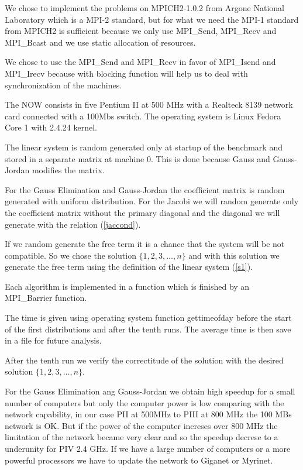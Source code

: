 \documentclass[times,10pt,twocolumn]{article}
\begin{document}

We chose to implement the problems on MPICH2-1.0.2 from Argone
National Laboratory \cite{argone} which is a MPI-2 standard, but
for what we need the MPI-1 standard from MPICH2 is sufficient
because we only use MPI\_Send, MPI\_Recv and MPI\_Bcast and we use
static allocation of resources.

We chose to use the MPI\_Send and MPI\_Recv in favor of MPI\_Isend
and MPI\_Irecv because with blocking function will help us to deal
with synchronization of the machines.

The NOW consists in five Pentium II at 500 MHz with a Realteck
8139 network card connected with a 100Mbs switch. The operating
system is Linux Fedora Core 1 with 2.4.24 kernel.

The linear system is random generated only at startup of the
benchmark and stored in a separate matrix at machine 0. This is
done because Gauss and Gauss-Jordan modifies the matrix.

For the Gauss Elimination and Gauss-Jordan the coefficient matrix
is random generated with uniform distribution. For the Jacobi we
will random generate only the coefficient matrix without the
primary diagonal and the diagonal we will generate with the
relation (\ref{jaccond}).

If we random generate the free term it is a chance that the system
will be not compatible. So we chose the solution
$\{1,2,3,\ldots,n\}$ and with this solution we generate the free
term using the definition of the linear system (\ref{s1}).

Each algorithm is implemented in a function which is finished by
an MPI\_Barrier function.

The time is given using operating system function gettimeofday
before the start of the first distributions and after the tenth
runs. The average time is then save in a file for future analysis.

After the tenth run we verify the correctitude of the solution
with the desired solution $\{1,2,3,\ldots,n\}$.


For the Gauss Elimination ang Gauss-Jordan we obtain high speedup for a 
small number of computers but only the computer power is low comparing with 
the network capability, in our case PII at 500MHz to PIII at 800 MHz the 100 MBs network is OK.
But if the power of the computer increses over 800 MHz the limitation of the 
network became very clear and so the speedup decrese to a underunity for PIV
2.4 GHz. If we have a large number of computers or a more powerful processors
we have to update the network to Giganet or Myrinet.
\end{document}
